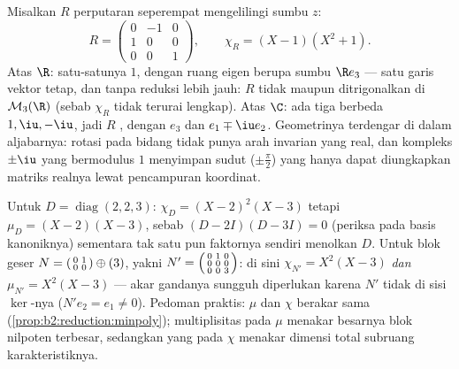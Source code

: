 \begin{example}\label{ex:b2:reduction:rotation3d}
Misalkan $R$ perputaran seperempat mengelilingi sumbu $z$:
\[
R = \begin{pmatrix}
0 & -1 & 0\\
1 & 0 & 0\\
0 & 0 & 1
\end{pmatrix},
\qquad
\chi_R = (X - 1)(X^2 + 1).
\]
Atas $\R$: satu-satunya  $1$, dengan ruang eigen berupa
sumbu $\R e_3$ --- satu garis vektor tetap, dan tanpa reduksi
lebih jauh: $R$ tidak  maupun ditrigonalkan di
$\mathcal{M}_3(\R)$ (sebab $\chi_R$ tidak terurai lengkap). Atas $\C$:
ada tiga  berbeda $1, \iu, -\iu$, jadi $R$ ,
dengan  $e_3$ dan $e_1 \mp \iu e_2$. Geometrinya
terdengar di dalam aljabarnya: rotasi pada bidang tidak punya arah
invarian yang real, dan  kompleks $\pm\iu$ yang
bermodulus $1$ menyimpan sudut ($\pm\frac\pi2$) yang hanya dapat
diungkapkan matriks realnya lewat pencampuran koordinat.
\end{example}

\begin{example}\label{ex:b2:reduction:minvschar}
Untuk $D = \operatorname{diag}(2, 2, 3)$: $\chi_D = (X - 2)^2(X -
3)$ tetapi $\mu_D = (X - 2)(X - 3)$, sebab $(D - 2I)(D - 3I) = 0$
(periksa pada basis kanoniknya) sementara tak satu pun faktornya sendiri
menolkan $D$. Untuk blok geser $N = \begin{psmallmatrix}0 & 1\\ 0 &
0\end{psmallmatrix} \oplus (3)$, yakni $N' =
\begin{psmallmatrix}0 & 1 & 0\\ 0 & 0 & 0\\ 0 & 0 &
3\end{psmallmatrix}$: di sini $\chi_{N'} = X^2(X - 3)$ \emph{dan}
$\mu_{N'} = X^2(X - 3)$ --- akar gandanya sungguh diperlukan
karena $N'$ tidak  di sisi $\ker$-nya ($N'e_2 =
e_1 \neq 0$). Pedoman praktis: $\mu$ dan $\chi$ berakar sama
(\cref{prop:b2:reduction:minpoly}); multiplisitas pada $\mu$
menakar besarnya blok nilpoten terbesar, sedangkan yang pada
$\chi$ menakar dimensi total subruang karakteristiknya.
\end{example}

